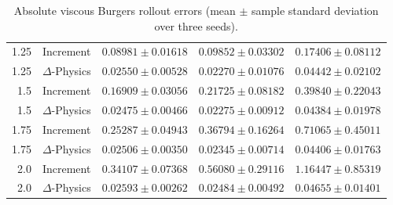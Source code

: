 \begin{table}[!htbp]
\begin{tabular}{@{}rlccc@{}}
1.25 & Increment & $0.08981\pm0.01618$ & $0.09852\pm0.03302$ & $0.17406\pm0.08112$ \\
1.25 & $\Delta$-Physics & $0.02550\pm0.00528$ & $0.02270\pm0.01076$ & $0.04442\pm0.02102$ \\
1.5 & Increment & $0.16909\pm0.03056$ & $0.21725\pm0.08182$ & $0.39840\pm0.22043$ \\
1.5 & $\Delta$-Physics & $0.02475\pm0.00466$ & $0.02275\pm0.00912$ & $0.04384\pm0.01978$ \\
1.75 & Increment & $0.25287\pm0.04943$ & $0.36794\pm0.16264$ & $0.71065\pm0.45011$ \\
1.75 & $\Delta$-Physics & $0.02506\pm0.00350$ & $0.02345\pm0.00714$ & $0.04406\pm0.01763$ \\
2.0 & Increment & $0.34107\pm0.07368$ & $0.56080\pm0.29116$ & $1.16447\pm0.85319$ \\
2.0 & $\Delta$-Physics & $0.02593\pm0.00262$ & $0.02484\pm0.00492$ & $0.04655\pm0.01401$ \\
\bottomrule
\end{tabular}\par\medskip
\caption{Absolute viscous Burgers rollout errors (mean $\pm$ sample standard deviation over three seeds).}
\label{tab:burgers_absolute}
\end{table}
